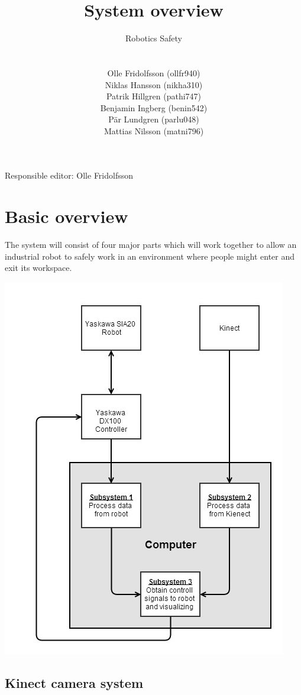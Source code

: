 \documentclass[10pt,a4paper,english]{article}
\title{System overview}
\author{\begin{large}{Robotics Safety}\end{large}\\\\
Olle Fridolfsson (ollfr940) \\  Niklas Hansson (nikha310) \\ Patrik Hillgren (pathi747) \\ Benjamin Ingberg (benin542)\\ Pär Lundgren (parlu048) \\ Mattias Nilsson (matni796)}
\begin{document}
\maketitle
\centerline {Responsible editor: Olle Fridolfsson}
\clearpage
\tableofcontents
\clearpage
\section{Basic overview}

The system will consist of four major parts which will work together to allow an industrial robot to safely work in an environment where people might enter and exit its workspace.

\includegraphics[width=\columnwidth]{robot_safety.jpg}

\subsection{Kinect camera system}
\end{document}

